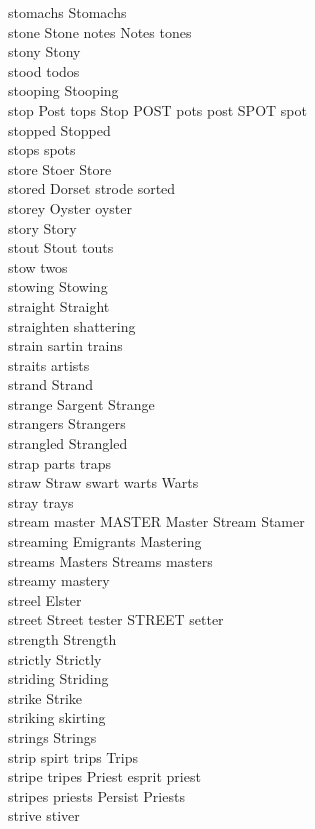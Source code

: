 stomachs Stomachs\\
stone Stone notes Notes tones\\
stony Stony\\
stood todos\\
stooping Stooping\\
stop Post tops Stop POST pots post SPOT spot\\
stopped Stopped\\
stops spots\\
store Stoer Store\\
stored Dorset strode sorted\\
storey Oyster oyster\\
story Story\\
stout Stout touts\\
stow twos\\
stowing Stowing\\
straight Straight\\
straighten shattering\\
strain sartin trains\\
straits artists\\
strand Strand\\
strange Sargent Strange\\
strangers Strangers\\
strangled Strangled\\
strap parts traps\\
straw Straw swart warts Warts\\
stray trays\\
stream master MASTER Master Stream Stamer\\
streaming Emigrants Mastering\\
streams Masters Streams masters\\
streamy mastery\\
streel Elster\\
street Street tester STREET setter\\
strength Strength\\
strictly Strictly\\
striding Striding\\
strike Strike\\
striking skirting\\
strings Strings\\
strip spirt trips Trips\\
stripe tripes Priest esprit priest\\
stripes priests Persist Priests\\
strive stiver\\
